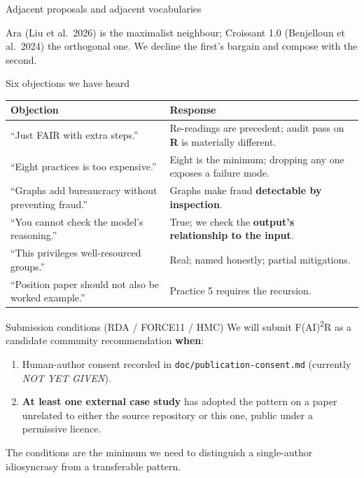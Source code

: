 \documentclass[aspectratio=169,11pt]{beamer}
\begin{document}
\begin{frame}{Adjacent proposals and adjacent vocabularies}
  \begin{center}
    \resizebox{0.92\linewidth}{!}{}
  \end{center}

  \vspace{0.3em}
  {\footnotesize Ara (Liu et al.\ 2026) is the maximalist neighbour;
  Croissant 1.0 (Benjelloun et al.\ 2024) the orthogonal one. We decline
  the first's bargain and compose with the second.}
\end{frame}

\begin{frame}{Six objections we have heard}
  \footnotesize
  \begin{tabular}{p{5.0cm}p{6.0cm}}
    \toprule
    Objection & Response \\
    \midrule
    ``Just FAIR with extra steps.''       & Re-readings are precedent; audit pass on \textbf{R} is materially different. \\
    ``Eight practices is too expensive.'' & Eight is the minimum; dropping any one exposes a failure mode. \\
    ``Graphs add bureaucracy without preventing fraud.'' & Graphs make fraud \textbf{detectable by inspection}. \\
    ``You cannot check the model's reasoning.'' & True; we check the \textbf{output's relationship to the input}. \\
    ``This privileges well-resourced groups.'' & Real; named honestly; partial mitigations. \\
    ``Position paper should not also be worked example.'' & Practice 5 requires the recursion. \\
    \bottomrule
  \end{tabular}
\end{frame}


\begin{frame}{Submission conditions (RDA / FORCE11 / HMC)}
  We will submit F(AI)\textsuperscript{2}R as a candidate community recommendation \textbf{when}:
  \begin{enumerate}
    \item Human-author consent recorded in \texttt{doc/publication-consent.md} (currently \emph{NOT YET GIVEN}).
    \item \textbf{At least one external case study} has adopted the pattern on a paper unrelated to either the source repository or this one, public under a permissive licence.
  \end{enumerate}

  \vspace{0.4em}
  The conditions are the minimum we need to distinguish a single-author idiosyncrasy from a transferable pattern.
\end{frame}
\end{document}

